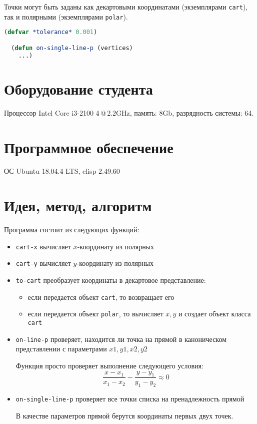\documentclass[12pt]{article}
\begin{document}
Точки могут быть заданы как декартовыми координатами (экземплярами {\tt cart}), так и полярными (экземплярами {\tt polar}).

\begin{lstlisting}[language=lisp]
  (defvar *tolerance* 0.001)

  (defun on-single-line-p (vertices)
    ...)
\end{lstlisting}
\section{Оборудование студента}
Процессор Intel Core i3-2100 4\,@\,2.2GHz, память: 8Gb, разрядность системы: 64.

\section{Программное обеспечение}
ОС Ubuntu 18.04.4 LTS, clisp 2.49.60

\section{Идея, метод, алгоритм}
Программа состоит из следующих функций:
\begin{itemize}
  \item {\tt cart-x} вычисляет $x$-координату из полярных
  \item {\tt cart-y} вычисляет $y$-координату из полярных
  \item {\tt to-cart} преобразует координаты в декартовое представление:
  
    \begin{itemize}
      \item если передается объект {\tt cart}, то возвращает его
      \item если передается объект {\tt polar}, то вычисляет $x, y$ и создает объект класса {\tt cart}
    \end{itemize}
  \item {\tt on-line-p} проверяет, находится ли точка на прямой в каноническом представлении с параметрами $x1, y1, x2, y2$
    
    Функция просто проверяет выполнение следующего условия:
    \[\frac{x - x_1}{x_1 - x_2} - \frac{y - y_1}{y_1 - y_2} \approx 0 \]
  \item {\tt on-single-line-p} проверяет все точки списка на пренадлежность прямой
    
    В качестве параметров прямой берутся координаты первых двух точек.
\end{itemize}
\end{document}
